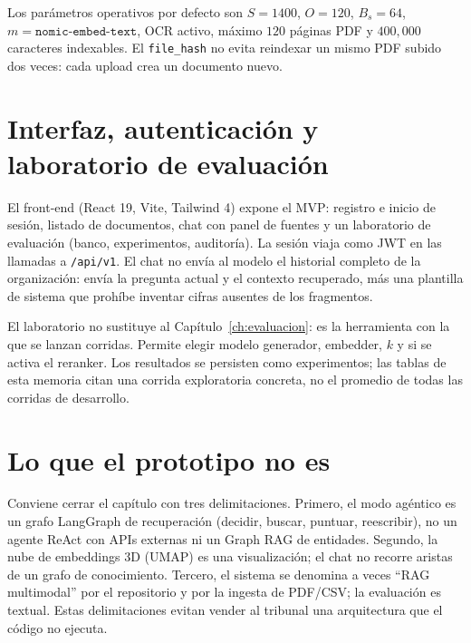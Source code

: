 Los parámetros operativos por defecto son $S{=}1400$, $O{=}120$, $B_s{=}64$, $m{=}\texttt{nomic-embed-text}$, OCR activo, máximo $120$ páginas PDF y $400{,}000$ caracteres indexables. El \texttt{file\_hash} no evita reindexar un mismo PDF subido dos veces: cada upload crea un documento nuevo.

\section{Interfaz, autenticación y laboratorio de evaluación}
El front-end (React 19, Vite, Tailwind 4) expone el MVP: registro e inicio de sesión, listado de documentos, chat con panel de fuentes y un laboratorio de evaluación (banco, experimentos, auditoría). La sesión viaja como JWT en las llamadas a \texttt{/api/v1}. El chat no envía al modelo el historial completo de la organización: envía la pregunta actual y el contexto recuperado, más una plantilla de sistema que prohíbe inventar cifras ausentes de los fragmentos.

El laboratorio no sustituye al Capítulo~\ref{ch:evaluacion}: es la herramienta con la que se lanzan corridas. Permite elegir modelo generador, embedder, $k$ y si se activa el reranker. Los resultados se persisten como experimentos; las tablas de esta memoria citan una corrida exploratoria concreta, no el promedio de todas las corridas de desarrollo.

\section{Lo que el prototipo no es}
Conviene cerrar el capítulo con tres delimitaciones. Primero, el modo agéntico es un grafo LangGraph de recuperación (decidir, buscar, puntuar, reescribir), no un agente ReAct con APIs externas ni un Graph RAG de entidades. Segundo, la nube de embeddings 3D (UMAP) es una visualización; el chat no recorre aristas de un grafo de conocimiento. Tercero, el sistema se denomina a veces ``RAG multimodal'' por el repositorio y por la ingesta de PDF/CSV; la evaluación es textual. Estas delimitaciones evitan vender al tribunal una arquitectura que el código no ejecuta.



